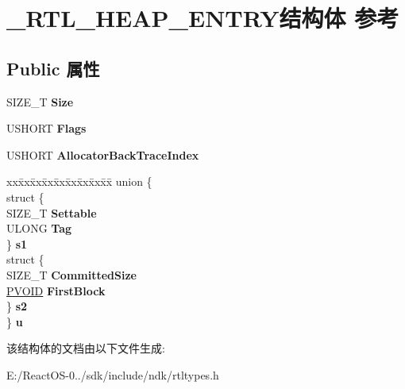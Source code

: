\hypertarget{struct___r_t_l___h_e_a_p___e_n_t_r_y}{}\section{\+\_\+\+R\+T\+L\+\_\+\+H\+E\+A\+P\+\_\+\+E\+N\+T\+R\+Y结构体 参考}
\label{struct___r_t_l___h_e_a_p___e_n_t_r_y}
\subsection*{Public 属性}
\begin{DoxyCompactItemize}
\item 
\mbox{\label{struct___r_t_l___h_e_a_p___e_n_t_r_y_ac8e34f74c283de9055478fa039d09c8c}} 
S\+I\+Z\+E\+\_\+T {\bfseries Size}
\item 
\mbox{\label{struct___r_t_l___h_e_a_p___e_n_t_r_y_af1adc87fb22a2317bc6ae5e60d2b527c}} 
U\+S\+H\+O\+RT {\bfseries Flags}
\item 
\mbox{\label{struct___r_t_l___h_e_a_p___e_n_t_r_y_a07d30f901740680438c5b2f2bef3b1c7}} 
U\+S\+H\+O\+RT {\bfseries Allocator\+Back\+Trace\+Index}
\item 
\mbox{\label{struct___r_t_l___h_e_a_p___e_n_t_r_y_a74ad34f267d3eb089612137de11195db}} 
\begin{tabbing}
xx\=xx\=xx\=xx\=xx\=xx\=xx\=xx\=xx\=\kill
union \{\\
\>struct \{\\
\>\>SIZE\_T {\bfseries Settable}\\
\>\>ULONG {\bfseries Tag}\\
\>\} {\bfseries s1}\\
\>struct \{\\
\>\>SIZE\_T {\bfseries CommittedSize}\\
\>\>\hyperlink{interfacevoid}{PVOID} {\bfseries FirstBlock}\\
\>\} {\bfseries s2}\\
\} {\bfseries u}\\

\end{tabbing}\end{DoxyCompactItemize}


该结构体的文档由以下文件生成\+:\begin{DoxyCompactItemize}
\item 
E\+:/\+React\+O\+S-\/0../sdk/include/ndk/rtltypes.\+h\end{DoxyCompactItemize}
